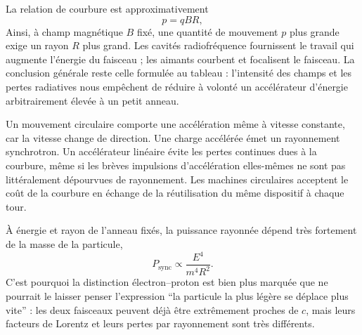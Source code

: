 La relation de courbure est approximativement
\begin{equation}
p=qBR,
\end{equation}
Ainsi, à champ magnétique \(B\) fixé, une quantité de mouvement \(p\) plus grande exige un rayon \(R\) plus grand. Les cavités radiofréquence fournissent le travail qui augmente l’énergie du faisceau ; les aimants courbent et focalisent le faisceau. La conclusion générale reste celle formulée au tableau : l’intensité des champs et les pertes radiatives nous empêchent de réduire à volonté un accélérateur d’énergie arbitrairement élevée à un petit anneau.

Un mouvement circulaire comporte une accélération même à vitesse constante, car la vitesse change de direction. Une charge accélérée émet un rayonnement synchrotron. Un accélérateur linéaire évite les pertes continues dues à la courbure, même si les brèves impulsions d’accélération elles-mêmes ne sont pas littéralement dépourvues de rayonnement. Les machines circulaires acceptent le coût de la courbure en échange de la réutilisation du même dispositif à chaque tour.

\begin{classroomqa}\end{classroomqa}

À énergie et rayon de l’anneau fixés, la puissance rayonnée dépend très fortement de la masse de la particule,
\begin{equation}
P_{\mathrm{sync}}\propto \frac{E^4}{m^4R^2}.
\end{equation}
C’est pourquoi la distinction électron--proton est bien plus marquée que ne pourrait le laisser penser l’expression ``la particule la plus légère se déplace plus vite'' : les deux faisceaux peuvent déjà être extrêmement proches de \(c\), mais leurs facteurs de Lorentz et leurs pertes par rayonnement sont très différents.

